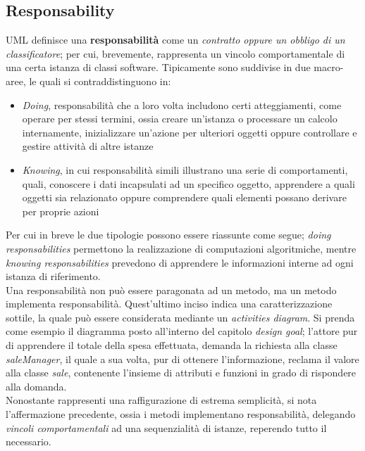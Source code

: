 \documentclass{article}
\begin{document}
\subsection*{Responsability}
\large
UML definisce una \textbf{responsabilità} come un \textit{contratto oppure un obbligo di un classificatore}; per cui, brevemente, rappresenta un vincolo comportamentale di una certa istanza di classi software. Tipicamente sono suddivise in due macro-aree, le quali si contraddistinguono in:
\begin{itemize}[label={-}]
    \itemsep0em
    \item \textit{Doing}, responsabilità che a loro volta includono certi atteggiamenti, come operare per stessi termini, ossia creare un'istanza o processare un calcolo internamente, inizializzare un'azione per ulteriori oggetti oppure controllare e gestire attività di altre istanze
    \item \textit{Knowing}, in cui responsabilità simili illustrano una serie di comportamenti, quali, conoscere i dati incapsulati ad un specifico oggetto, apprendere a quali oggetti sia relazionato oppure comprendere quali elementi possano derivare per proprie azioni
\end{itemize}
Per cui in breve le due tipologie possono essere riassunte come segue; \textit{doing responsabilities} permettono la realizzazione di computazioni algoritmiche, mentre \textit{knowing responsabilities} prevedono di apprendere le informazioni interne ad ogni istanza di riferimento.\vspace*{14pt}\\
Una responsabilità non può essere paragonata ad un metodo, ma un metodo implementa responsabilità. Quest'ultimo inciso indica una caratterizzazione sottile, la quale può essere considerata mediante un \textit{activities diagram}. Si prenda come esempio il diagramma posto all'interno del capitolo \textit{design goal}; l'attore pur di apprendere il totale della spesa effettuata, demanda la richiesta alla classe \textit{saleManager}, il quale a sua volta, pur di ottenere l'informazione, reclama il valore alla classe \textit{sale}, contenente l'insieme di attributi e funzioni in grado di rispondere alla domanda.\vspace*{14pt}\\
Nonostante rappresenti una raffigurazione di estrema semplicità, si nota l'affermazione precedente, ossia i metodi implementano responsabilità, delegando \textit{vincoli comportamentali} ad una sequenzialità di istanze, reperendo tutto il necessario.\vspace*{14pt}
\end{document}
